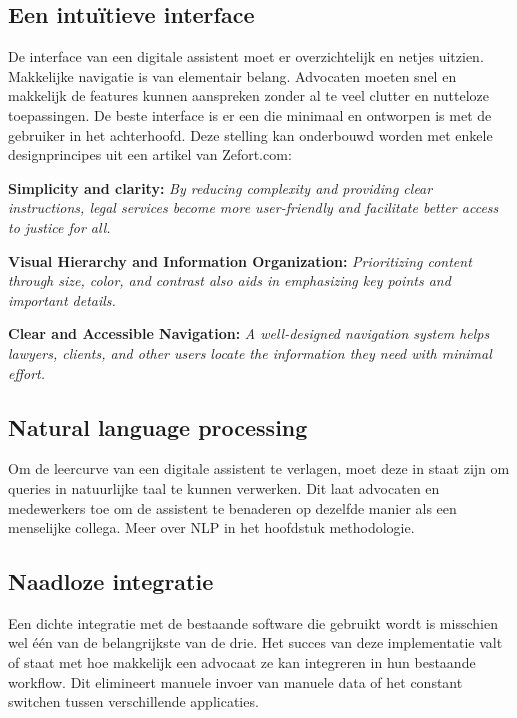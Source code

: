 \subsection{Een intuïtieve interface}
De interface van een digitale assistent moet er overzichtelijk en netjes uitzien.
Makkelijke navigatie is van elementair belang.
Advocaten moeten snel en makkelijk de features kunnen aanspreken zonder al te veel clutter en nutteloze toepassingen.
De beste interface is er een die minimaal en ontworpen is met de gebruiker in het achterhoofd.
Deze stelling kan onderbouwd worden met enkele designprincipes uit een artikel van Zefort.com:

\begin{displayquote}
	\textbf{Simplicity and clarity:}
	\textit{By reducing complexity and providing clear instructions, legal services become more user-friendly and facilitate better access to justice for all.}
	\autocite{Zefort}

	\textbf{Visual Hierarchy and Information Organization:}
	\textit{Prioritizing content through size, color, and contrast also aids in emphasizing key points and important details.}
	\autocite{Zefort}

	\textbf{Clear and Accessible Navigation:}
	\textit{A well-designed navigation system helps lawyers, clients, and other users locate the information they need with minimal effort.}
	\autocite{Zefort}
\end{displayquote}

\subsection{Natural language processing}
Om de leercurve van een digitale assistent te verlagen, moet deze in staat zijn om queries in natuurlijke taal te kunnen verwerken.
Dit laat advocaten en medewerkers toe om de assistent te benaderen op dezelfde manier als een menselijke collega. Meer over NLP in het hoofdstuk methodologie.

\subsection{Naadloze integratie}
Een dichte integratie met de bestaande software die gebruikt wordt is misschien wel één van de belangrijkste van de drie. Het succes van deze implementatie valt of staat met hoe makkelijk
een advocaat ze kan integreren in hun bestaande workflow. Dit elimineert manuele invoer van manuele data of het constant switchen tussen verschillende applicaties.

